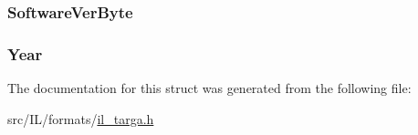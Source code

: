 \hypertarget{struct_t_a_r_g_a_e_x_t_a66e9c3f8c7fbd4b97536f9b6ae117a95}{
\subsubsection[{Software\-Ver\-Byte}]{ Software\-Ver\-Byte}}\label{struct_t_a_r_g_a_e_x_t_a66e9c3f8c7fbd4b97536f9b6ae117a95}
\hypertarget{struct_t_a_r_g_a_e_x_t_aa949606ea4e950a7d88cdf5ee1d50089}{
\subsubsection[{Year}]{ Year}}\label{struct_t_a_r_g_a_e_x_t_aa949606ea4e950a7d88cdf5ee1d50089}


The documentation for this struct was generated from the following file\-:\begin{DoxyCompactItemize}
\item 
src/\-I\-L/formats/\hyperlink{il__targa_8h}{il\-\_\-targa.\-h}\end{DoxyCompactItemize}

